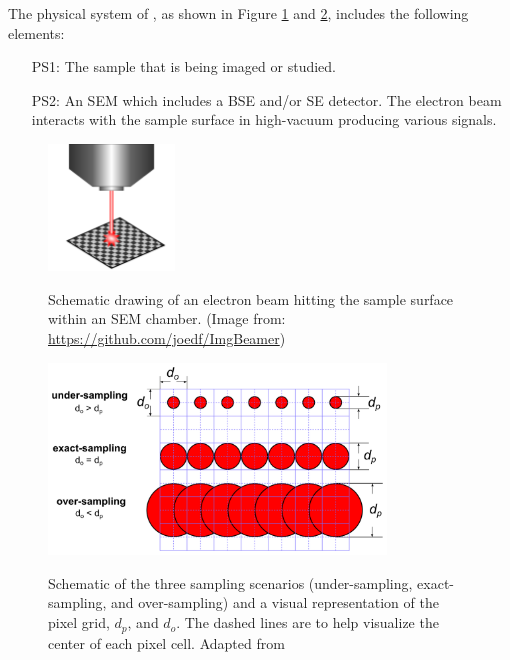 \documentclass[12pt]{article}
\begin{document}
The physical system of \progname{}, as shown in Figure \ref{fig_ebeam} and \ref{fig_sampling},
includes the following elements:

\begin{itemize}

\item[PS1:] The sample that is being imaged or studied.

\item[PS2:] An SEM which includes a BSE and/or SE detector. The electron beam interacts with the sample surface in high-vacuum producing various signals.

\end{itemize}

\setlength{\belowcaptionskip}{-30pt}
\begin{figure}[h!]
\begin{center}
{
 \includegraphics[width=0.3\textwidth]{figures/e_beam.png}
}
\caption{\label{fig_ebeam} Schematic drawing of an electron beam hitting the sample surface within an SEM chamber. (Image from: \url{https://github.com/joedf/ImgBeamer})}
\end{center}
\end{figure}

\begin{figure}[h!]
\begin{center}
{
 \includegraphics[width=0.8\textwidth]{figures/sampling.png}
}
\caption{\label{fig_sampling} Schematic of the three sampling scenarios (under-sampling, exact-sampling, and over-sampling) and a visual representation of the pixel grid, $d_p$, and $d_o$. The dashed lines are to help visualize the center of each pixel cell. Adapted from \citet{lifshin_improving_2014}}
\end{center}
\end{figure}
\setlength{\belowcaptionskip}{10pt}
\end{document}
